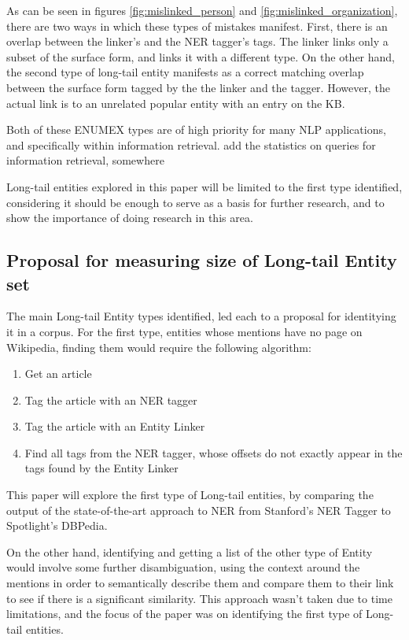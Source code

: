 As can be seen in figures \ref{fig:mislinked_person} and \ref{fig:mislinked_organization}, there are two ways in which these types of mistakes manifest.
First, there is an overlap between the linker's and the NER tagger's tags. The linker links only a subset of the surface form, and links it with a different type.
On the other hand, the second type of long-tail entity manifests as a correct matching overlap between the surface form tagged by the the linker and the tagger.
However, the actual link is to an unrelated popular entity with an entry on the KB. 

Both of these ENUMEX types are of high priority for many NLP applications, and specifically within information retrieval. 
\todo add the statistics on queries for information retrieval, somewhere

Long-tail entities explored in this paper will be limited to the first type identified, considering it should be enough to serve as a basis for further research,
and to show the importance of doing research in this area. 


\subsection{Proposal for measuring size of Long-tail Entity set}
The main Long-tail Entity types identified, led each to a proposal for identitying it in a corpus. 
For the first type, entities whose mentions have no page on Wikipedia, finding them would require the following algorithm:
\
\begin{enumerate}
\item Get an article
\item Tag the article with an NER tagger
\item Tag the article with an Entity Linker
\item Find all tags from the NER tagger, whose offsets do not exactly appear in the tags found by the Entity Linker
\end{enumerate}
This paper will explore the first type of Long-tail entities, by comparing the output of the state-of-the-art approach to NER from Stanford's NER Tagger
to Spotlight's DBPedia.

On the other hand, identifying and getting a list of the other type of Entity would involve some further disambiguation,
using the context around the mentions in order to semantically describe them and compare them to their link to see if there is a significant similarity.
This approach wasn't taken due to time limitations, and the focus of the paper was on identifying the first type of Long-tail entities.


